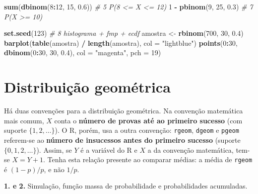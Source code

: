 \documentclass[
  portuguese,
  11pt,
  openany]{book}
\newenvironment{Shaded}{\begin{snugshade}}{\end{snugshade}}
\newcommand{\AttributeTok}[1]{\textcolor[rgb]{0.13,0.29,0.53}{#1}}
\newcommand{\CommentTok}[1]{\textcolor[rgb]{0.56,0.35,0.01}{\textit{#1}}}
\newcommand{\DecValTok}[1]{\textcolor[rgb]{0.00,0.00,0.81}{#1}}
\newcommand{\FloatTok}[1]{\textcolor[rgb]{0.00,0.00,0.81}{#1}}
\newcommand{\FunctionTok}[1]{\textcolor[rgb]{0.13,0.29,0.53}{\textbf{#1}}}
\newcommand{\NormalTok}[1]{#1}
\newcommand{\OtherTok}[1]{\textcolor[rgb]{0.56,0.35,0.01}{#1}}
\newcommand{\SpecialCharTok}[1]{\textcolor[rgb]{0.81,0.36,0.00}{\textbf{#1}}}
\newcommand{\StringTok}[1]{\textcolor[rgb]{0.31,0.60,0.02}{#1}}
\begin{document}
\begin{Shaded}
\begin{Highlighting}[]
\FunctionTok{sum}\NormalTok{(}\FunctionTok{dbinom}\NormalTok{(}\DecValTok{8}\SpecialCharTok{:}\DecValTok{12}\NormalTok{, }\DecValTok{15}\NormalTok{, }\FloatTok{0.6}\NormalTok{))               }\CommentTok{\# 5 P(8 \textless{}= X \textless{}= 12)}
\DecValTok{1} \SpecialCharTok{{-}} \FunctionTok{pbinom}\NormalTok{(}\DecValTok{9}\NormalTok{, }\DecValTok{25}\NormalTok{, }\FloatTok{0.3}\NormalTok{)                    }\CommentTok{\# 7 P(X \textgreater{}= 10)}

\FunctionTok{set.seed}\NormalTok{(}\DecValTok{123}\NormalTok{)                             }\CommentTok{\# 8 histograma + fmp + ecdf}
\NormalTok{amostra }\OtherTok{\textless{}{-}} \FunctionTok{rbinom}\NormalTok{(}\DecValTok{700}\NormalTok{, }\DecValTok{30}\NormalTok{, }\FloatTok{0.4}\NormalTok{)}
\FunctionTok{barplot}\NormalTok{(}\FunctionTok{table}\NormalTok{(amostra) }\SpecialCharTok{/} \FunctionTok{length}\NormalTok{(amostra), }\AttributeTok{col =} \StringTok{"lightblue"}\NormalTok{)}
\FunctionTok{points}\NormalTok{(}\DecValTok{0}\SpecialCharTok{:}\DecValTok{30}\NormalTok{, }\FunctionTok{dbinom}\NormalTok{(}\DecValTok{0}\SpecialCharTok{:}\DecValTok{30}\NormalTok{, }\DecValTok{30}\NormalTok{, }\FloatTok{0.4}\NormalTok{), }\AttributeTok{col =} \StringTok{"magenta"}\NormalTok{, }\AttributeTok{pch =} \DecValTok{19}\NormalTok{)}
\end{Highlighting}
\end{Shaded}

\section{Distribuição geométrica}\label{distribuiuxe7uxe3o-geomuxe9trica-1}

Há duas convenções para a distribuição geométrica. Na convenção matemática mais
comum, \(X\) conta o \textbf{número de provas até ao primeiro sucesso} (com suporte
\(\{1, 2, \ldots\}\)). O R, porém, usa a outra convenção: \texttt{rgeom}, \texttt{dgeom} e
\texttt{pgeom} referem-se ao \textbf{número de insucessos antes do primeiro sucesso} (suporte
\(\{0, 1, 2, \ldots\}\)). Assim, se \(Y\) é a variável do R e \(X\) a da convenção
matemática, tem-se \(X = Y + 1\). Tenha esta relação presente ao comparar médias:
a média de \texttt{rgeom} é \((1-p)/p\), e não \(1/p\).

\textbf{1. e 2.} Simulação, função massa de probabilidade e probabilidades acumuladas.
\end{document}
